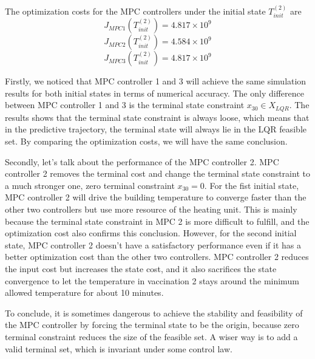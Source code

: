 \documentclass[a4paper,twoside,11pt]{article}
\numberwithin{equation}{section}
\begin{document}
The optimization costs for the MPC controllers under the initial state $T^{(2)}_{init}$ are
\begin{equation*}
    J_{MPC1}(T^{(2)}_{init}) = 4.817\times10^9
\end{equation*}
\begin{equation*}
    J_{MPC2}(T^{(2)}_{init}) = 4.584\times10^9
\end{equation*}
\begin{equation*}
    J_{MPC3}(T^{(2)}_{init}) = 4.817\times10^9
\end{equation*}

Firstly, we noticed that MPC controller 1 and 3 will achieve the same simulation results for both initial states in terms of numerical accuracy. The only difference between MPC controller 1 and 3 is the terminal state constraint $x_{30}\in X_{LQR}$. The results shows that the terminal state constraint is always loose, which means that in the predictive trajectory, the terminal state will always lie in the LQR feasible set. By comparing the optimization costs, we will have the same conclusion.

Secondly, let's talk about the performance of the MPC controller 2. MPC controller 2 removes the terminal cost and change the terminal state constraint to a much stronger one, zero terminal constraint $x_{30}=0$. For the fist initial state, MPC controller 2 will drive the building temperature to converge faster than the other two controllers but use more resource of the heating unit. This is mainly because the terminal state constraint in MPC 2 is more difficult to fulfill, and the optimization cost also confirms this conclusion. However, for the second initial state, MPC controller 2 doesn't have a satisfactory performance even if it has a better optimization cost than the other two controllers. MPC controller 2 reduces the input cost but increases the state cost, and it also sacrifices the state convergence to let the temperature in vaccination 2 stays around the minimum allowed temperature for about 10 minutes. 

To conclude, it is sometimes dangerous to achieve the stability and feasibility of the MPC controller by forcing the terminal state to be the origin, because zero terminal constraint reduces the size of the feasible set. A wiser way is to add a valid terminal set, which is invariant under some control law. 

\newpage
\end{document}

